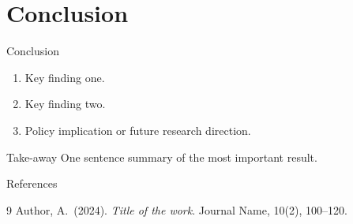 \documentclass[aspectratio=169]{beamer}
\begin{document}
\section{Conclusion}

\begin{frame}{Conclusion}
  \begin{enumerate}
    \item Key finding one.
    \item Key finding two.
    \item Policy implication or future research direction.
  \end{enumerate}

  \vspace{1em}
  \begin{exampleblock}{Take-away}
    One sentence summary of the most important result.
  \end{exampleblock}
\end{frame}

\begin{frame}[allowframebreaks]{References}
  
  \begin{thebibliography}{9}
      Author, A.\ (2024).
      \emph{Title of the work}.
      Journal Name, 10(2), 100--120.
  \end{thebibliography}
\end{frame}
\end{document}
